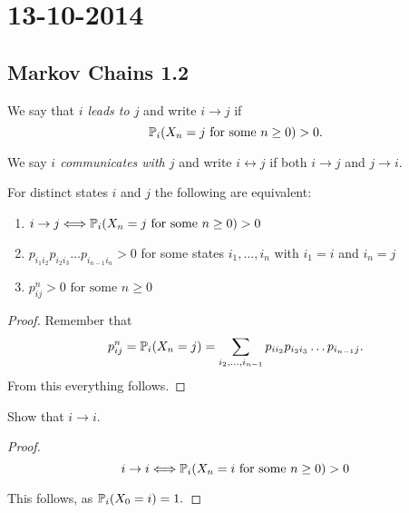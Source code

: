 \section{13-10-2014}
\subsection{Markov Chains 1.2}



\begin{defn}
We say that \emph{\(i\) leads to \(j\)} and write \(i\rightarrow j\) if
\[
\Bbb{P}_{i}(X_{n}=j\space \text{ for some }n\geq 0)>0.
\]
\end{defn}

\begin{defn}
We say \emph{\(i\) communicates with \(j\)} and write \(i\leftrightarrow j\) if both \(i\rightarrow j\) and \(j\rightarrow i\).
\end{defn}

\begin{thm}
For distinct states \(i\) and \(j\) the following are equivalent:

\begin{enumerate}
  \item \(i\rightarrow j\space \Longleftrightarrow \space \Bbb{P}_{i}(X_{n}=j\space \text{ for some }n\geq 0)>0\)
  \item \(p_{i_{1}i_{2}}p_{i_{2}i_{3}}\ldots p_{i_{n-1}i_{n}}>0\) for some states \(i_{1},\ldots ,i_{n}\) with \(i_{1}=i\) and \(i_{n}=j\)
  \item \(p_{ij}^n>0 \text{ for some } n\geq 0\)
\end{enumerate}

\end{thm}

\begin{proof}
Remember that
\[
p_{ij}^n=\Bbb{P}_{i}(X_{n}=j)=\sum _{i_{2},\ldots ,i_{n-1}}p_{ii_{2}}p_{i_{2}i_{3}}\ldots p_{i_{n-1}j}.
\]
From this everything follows.
\end{proof}

\begin{prop}
Show that \(i\rightarrow i\).
\end{prop}

\begin{proof}
\[
i\rightarrow i\space \Longleftrightarrow \space \space \Bbb{P}_{i}(X_{n}=i\space \text{ for some }n\geq 0)>0
\]

This follows, as \(\Bbb{P}_{i}(X_{0}=i)=1.\)
\end{proof}


